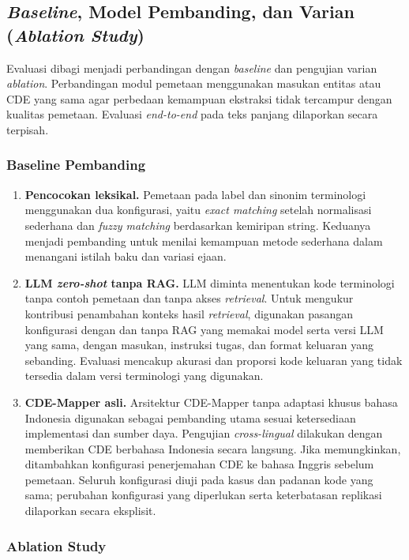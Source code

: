 \subsection{\textit{Baseline}, Model Pembanding, dan Varian (\textit{Ablation Study})}

Evaluasi dibagi menjadi perbandingan dengan \textit{baseline} dan pengujian varian \textit{ablation}. Perbandingan modul pemetaan menggunakan masukan entitas atau CDE yang sama agar perbedaan kemampuan ekstraksi tidak tercampur dengan kualitas pemetaan. Evaluasi \textit{end-to-end} pada teks panjang dilaporkan secara terpisah.

\subsubsection{Baseline Pembanding}

\begin{enumerate}
    \item \textbf{Pencocokan leksikal.} Pemetaan pada label dan sinonim terminologi menggunakan dua konfigurasi, yaitu \textit{exact matching} setelah normalisasi sederhana dan \textit{fuzzy matching} berdasarkan kemiripan string. Keduanya menjadi pembanding untuk menilai kemampuan metode sederhana dalam menangani istilah baku dan variasi ejaan.
    \item \textbf{LLM \textit{zero-shot} tanpa RAG.} LLM diminta menentukan kode terminologi tanpa contoh pemetaan dan tanpa akses \textit{retrieval}. Untuk mengukur kontribusi penambahan konteks hasil \textit{retrieval}, digunakan pasangan konfigurasi dengan dan tanpa RAG yang memakai model serta versi LLM yang sama, dengan masukan, instruksi tugas, dan format keluaran yang sebanding. Evaluasi mencakup akurasi dan proporsi kode keluaran yang tidak tersedia dalam versi terminologi yang digunakan.
    \item \textbf{CDE-Mapper asli.} Arsitektur CDE-Mapper \citep{gilani_cde-mapper_2025} tanpa adaptasi khusus bahasa Indonesia digunakan sebagai pembanding utama sesuai ketersediaan implementasi dan sumber daya. Pengujian \textit{cross-lingual} dilakukan dengan memberikan CDE berbahasa Indonesia secara langsung. Jika memungkinkan, ditambahkan konfigurasi penerjemahan CDE ke bahasa Inggris sebelum pemetaan. Seluruh konfigurasi diuji pada kasus dan padanan kode yang sama; perubahan konfigurasi yang diperlukan serta keterbatasan replikasi dilaporkan secara eksplisit.
\end{enumerate}

\subsubsection{Ablation Study}

